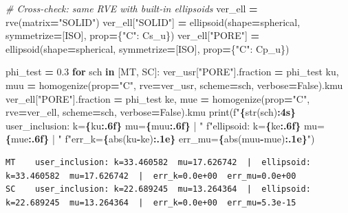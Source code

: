 \documentclass[
  a4paper,
  numbers=noendperiod,
  DIV=12]{scrreprt}
\newenvironment{Shaded}{\begin{snugshade}}{\end{snugshade}}
\newcommand{\BuiltInTok}[1]{#1}
\newcommand{\CommentTok}[1]{\textcolor[rgb]{0.56,0.35,0.01}{\textit{#1}}}
\newcommand{\ControlFlowTok}[1]{\textcolor[rgb]{0.13,0.29,0.53}{\textbf{#1}}}
\newcommand{\FloatTok}[1]{\textcolor[rgb]{0.00,0.00,0.81}{#1}}
\newcommand{\KeywordTok}[1]{\textcolor[rgb]{0.13,0.29,0.53}{\textbf{#1}}}
\newcommand{\NormalTok}[1]{#1}
\newcommand{\OperatorTok}[1]{\textcolor[rgb]{0.81,0.36,0.00}{\textbf{#1}}}
\newcommand{\SpecialCharTok}[1]{\textcolor[rgb]{0.81,0.36,0.00}{\textbf{#1}}}
\newcommand{\SpecialStringTok}[1]{\textcolor[rgb]{0.31,0.60,0.02}{#1}}
\newcommand{\StringTok}[1]{\textcolor[rgb]{0.31,0.60,0.02}{#1}}
\newcommand{\VariableTok}[1]{\textcolor[rgb]{0.00,0.00,0.00}{#1}}
\begin{document}
\begin{Shaded}
\begin{Highlighting}[]
\CommentTok{\# Cross{-}check: same RVE with built{-}in ellipsoids}
\NormalTok{ver\_ell }\OperatorTok{=}\NormalTok{ rve(matrix}\OperatorTok{=}\StringTok{"SOLID"}\NormalTok{)}
\NormalTok{ver\_ell[}\StringTok{"SOLID"}\NormalTok{] }\OperatorTok{=}\NormalTok{ ellipsoid(shape}\OperatorTok{=}\NormalTok{spherical, symmetrize}\OperatorTok{=}\NormalTok{[ISO], prop}\OperatorTok{=}\NormalTok{\{}\StringTok{"C"}\NormalTok{: Cs\_u\})}
\NormalTok{ver\_ell[}\StringTok{"PORE"}\NormalTok{]  }\OperatorTok{=}\NormalTok{ ellipsoid(shape}\OperatorTok{=}\NormalTok{spherical, symmetrize}\OperatorTok{=}\NormalTok{[ISO], prop}\OperatorTok{=}\NormalTok{\{}\StringTok{"C"}\NormalTok{: Cp\_u\})}

\NormalTok{phi\_test }\OperatorTok{=} \FloatTok{0.3}
\ControlFlowTok{for}\NormalTok{ sch }\KeywordTok{in}\NormalTok{ [MT, SC]:}
\NormalTok{    ver\_usr[}\StringTok{"PORE"}\NormalTok{].fraction }\OperatorTok{=}\NormalTok{ phi\_test}
\NormalTok{    ku, muu }\OperatorTok{=}\NormalTok{ homogenize(prop}\OperatorTok{=}\StringTok{"C"}\NormalTok{, rve}\OperatorTok{=}\NormalTok{ver\_usr, scheme}\OperatorTok{=}\NormalTok{sch, verbose}\OperatorTok{=}\VariableTok{False}\NormalTok{).kmu}
\NormalTok{    ver\_ell[}\StringTok{"PORE"}\NormalTok{].fraction }\OperatorTok{=}\NormalTok{ phi\_test}
\NormalTok{    ke, mue }\OperatorTok{=}\NormalTok{ homogenize(prop}\OperatorTok{=}\StringTok{"C"}\NormalTok{, rve}\OperatorTok{=}\NormalTok{ver\_ell, scheme}\OperatorTok{=}\NormalTok{sch, verbose}\OperatorTok{=}\VariableTok{False}\NormalTok{).kmu}
    \BuiltInTok{print}\NormalTok{(}\SpecialStringTok{f"}\SpecialCharTok{\{}\BuiltInTok{str}\NormalTok{(sch)}\SpecialCharTok{:4s\}}\SpecialStringTok{  user\_inclusion: k=}\SpecialCharTok{\{}\NormalTok{ku}\SpecialCharTok{:.6f\}}\SpecialStringTok{  mu=}\SpecialCharTok{\{}\NormalTok{muu}\SpecialCharTok{:.6f\}}\SpecialStringTok{  |  "}
          \SpecialStringTok{f"ellipsoid: k=}\SpecialCharTok{\{}\NormalTok{ke}\SpecialCharTok{:.6f\}}\SpecialStringTok{  mu=}\SpecialCharTok{\{}\NormalTok{mue}\SpecialCharTok{:.6f\}}\SpecialStringTok{  |  "}
          \SpecialStringTok{f"err\_k=}\SpecialCharTok{\{}\BuiltInTok{abs}\NormalTok{(ku}\OperatorTok{{-}}\NormalTok{ke)}\SpecialCharTok{:.1e\}}\SpecialStringTok{  err\_mu=}\SpecialCharTok{\{}\BuiltInTok{abs}\NormalTok{(muu}\OperatorTok{{-}}\NormalTok{mue)}\SpecialCharTok{:.1e\}}\SpecialStringTok{"}\NormalTok{)}
\end{Highlighting}
\end{Shaded}

\begin{verbatim}
MT    user_inclusion: k=33.460582  mu=17.626742  |  ellipsoid: k=33.460582  mu=17.626742  |  err_k=0.0e+00  err_mu=0.0e+00
SC    user_inclusion: k=22.689245  mu=13.264364  |  ellipsoid: k=22.689245  mu=13.264364  |  err_k=0.0e+00  err_mu=5.3e-15
\end{verbatim}
\end{document}

